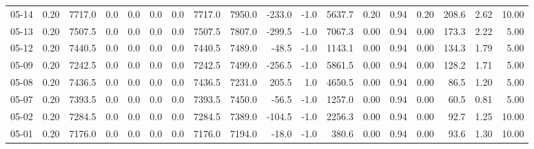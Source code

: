 \begin{threeparttable}
{\begin{tabular}{lrrrrrrrrrrrrrrrrr}
  05-14 &     0.20 & 7717.0 &               0.0 &               0.0 &                0.0 &                0.0 & 7717.0 & 7950.0 &     -233.0 &                     -1.0 &              5637.7 &       0.20 &      0.94 &           0.20 &            208.6 &            2.62 &                  10.00 \\
  05-13 &     0.20 & 7507.5 &               0.0 &               0.0 &                0.0 &                0.0 & 7507.5 & 7807.0 &     -299.5 &                     -1.0 &              7067.3 &       0.00 &      0.94 &           0.00 &            173.3 &            2.22 &                   5.00 \\
  05-12 &     0.20 & 7440.5 &               0.0 &               0.0 &                0.0 &                0.0 & 7440.5 & 7489.0 &      -48.5 &                     -1.0 &              1143.1 &       0.00 &      0.94 &           0.00 &            134.3 &            1.79 &                   5.00 \\
  05-09 &     0.20 & 7242.5 &               0.0 &               0.0 &                0.0 &                0.0 & 7242.5 & 7499.0 &     -256.5 &                     -1.0 &              5861.5 &       0.00 &      0.94 &           0.00 &            128.2 &            1.71 &                   5.00 \\
  05-08 &     0.20 & 7436.5 &               0.0 &               0.0 &                0.0 &                0.0 & 7436.5 & 7231.0 &      205.5 &                      1.0 &              4650.5 &       0.00 &      0.94 &           0.00 &             86.5 &            1.20 &                   5.00 \\
  05-07 &     0.20 & 7393.5 &               0.0 &               0.0 &                0.0 &                0.0 & 7393.5 & 7450.0 &      -56.5 &                     -1.0 &              1257.0 &       0.00 &      0.94 &           0.00 &             60.5 &            0.81 &                   5.00 \\
  05-02 &     0.20 & 7284.5 &               0.0 &               0.0 &                0.0 &                0.0 & 7284.5 & 7389.0 &     -104.5 &                     -1.0 &              2256.3 &       0.00 &      0.94 &           0.00 &             92.7 &            1.25 &                  10.00 \\
  05-01 &     0.20 & 7176.0 &               0.0 &               0.0 &                0.0 &                0.0 & 7176.0 & 7194.0 &      -18.0 &                     -1.0 &               380.6 &       0.00 &      0.94 &           0.00 &             93.6 &            1.30 &                  10.00 \\

\end{tabular}}
\end{threeparttable}
